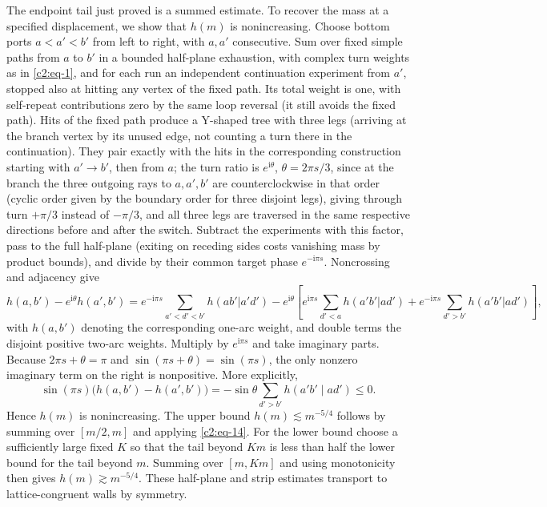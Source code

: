 The endpoint tail just proved is a summed estimate.  To recover the mass
at a specified displacement, we show that $h(m)$ is nonincreasing.
Choose bottom ports \(a<a'<b'\) from left to right, with \(a,a'\) consecutive. Sum over fixed simple paths from \(a\) to \(b'\) in a bounded half-plane exhaustion, with complex turn weights as in \eqref{c2:eq-1}, and for each run an independent continuation experiment from \(a'\), stopped also at hitting any vertex of the fixed path. Its total weight is one, with self-repeat contributions zero by the same loop reversal (it still avoids the fixed path). Hits of the fixed path produce a Y-shaped tree with three legs (arriving at the branch vertex by its unused edge, not counting a turn there in the continuation). They pair exactly with the hits in the corresponding construction starting with \(a'\to b'\), then from \(a\); the turn ratio is \(e^{\mathrm i\theta}\), \(\theta=2\pi s/3\), since at the branch the three outgoing rays to \(a,a',b'\) are counterclockwise in that order (cyclic order given by the boundary order for three disjoint legs), giving through turn \(+\pi/3\) instead of \(-\pi/3\), and all three legs are traversed in the same respective directions before and after the switch. Subtract the experiments with this factor, pass to the full half-plane (exiting on receding sides costs vanishing mass by product bounds), and divide by their common target phase \(e^{-\mathrm i\pi s}\). Noncrossing and adjacency give
\[
 h(a,b')-e^{\mathrm i\theta}h(a',b')
 =e^{-\mathrm i\pi s}\sum_{a'<d'<b'} h(ab'|a'd')
 -e^{\mathrm i\theta}
 \left[e^{\mathrm i\pi s}\sum_{d'<a}h(a'b'|a d')+
       e^{-\mathrm i\pi s}\sum_{d'>b'}h(a'b'|a d')\right],
\]
with \(h(a,b')\) denoting the corresponding one-arc weight, and double terms the disjoint positive two-arc weights. Multiply by $e^{\mathrm i\pi s}$ and take imaginary parts.
Because $2\pi s+\theta=\pi$ and
$\sin(\pi s+\theta)=\sin(\pi s)$, the only nonzero imaginary term
on the right is nonpositive.  More explicitly,
\[
 \sin(\pi s)\bigl(h(a,b')-h(a',b')\bigr)
 =-\sin\theta\sum_{d'>b'}h(a'b'\mid ad')\le0.
\]
Hence $h(m)$ is nonincreasing.  The upper bound
$h(m)\lesssim m^{-5/4}$ follows by summing over $[m/2,m]$ and applying
\eqref{c2:eq-14}.  For the lower bound choose a sufficiently large fixed
$K$ so that the tail beyond $Km$ is less than half the lower bound for
the tail beyond $m$.  Summing over $[m,Km]$ and using monotonicity then
gives $h(m)\gtrsim m^{-5/4}$. These half-plane and strip estimates transport to lattice-congruent walls by symmetry.

